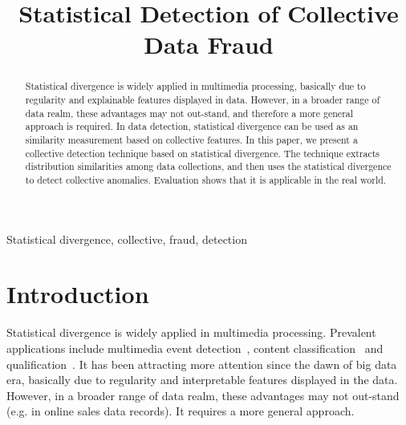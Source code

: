 \documentclass{article}
\begin{document}
\sloppy

	\def\x{{\mathbf x}}
	\def\L{{\cal L}}
	
	
	\title{Statistical Detection of Collective Data Fraud}
	\address{}
	
	
	\maketitle
	
	\begin{abstract}
		Statistical divergence is widely applied in multimedia processing, basically due to regularity and explainable features displayed in data. However, in a broader range of data realm, these advantages may not out-stand, and therefore a more general approach is required. In data detection, statistical divergence can be used as an similarity measurement based on collective features.
		In this paper, we present a collective detection technique based on statistical divergence.
		The technique extracts distribution similarities among data collections, and then uses the statistical divergence to detect collective anomalies.
		Evaluation shows that it is applicable in the real world. 
	\end{abstract}
	
	\begin{keywords}
		Statistical divergence, collective, fraud, detection
	\end{keywords}
	
	\section{Introduction}
		\label{sec:intro}
		Statistical divergence is widely applied in multimedia processing. Prevalent applications include multimedia event detection~\cite{amid2014unsupervised}, content classification~\cite{moreno2004kullback,park2005classification} and qualification~\cite{pheng2016kullback,goldberger2003efficient}. It has been attracting more attention since the dawn of big data era, basically due to regularity and interpretable features displayed in the data. However, in a broader range of data realm, these advantages may not out-stand (e.g. in online sales data records). It requires a more general approach.
		
\end{document}
